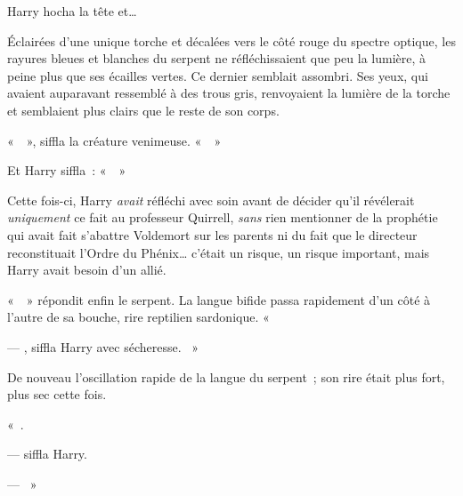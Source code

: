 Harry hocha la tête et…

Éclairées d'une unique torche et décalées vers le côté rouge du spectre optique, les rayures bleues et blanches du serpent ne réfléchissaient que peu la lumière, à peine plus que ses écailles vertes.
Ce dernier semblait assombri.
Ses yeux, qui avaient auparavant ressemblé à des trous gris, renvoyaient la lumière de la torche et semblaient plus clairs que le reste de son corps.

«~~», siffla la créature venimeuse.
«~~»

Et Harry siffla~: «~~»

Cette fois-ci, Harry \emph{avait} réfléchi avec soin avant de décider qu'il révélerait \emph{uniquement} ce fait au professeur Quirrell, \emph{sans} rien mentionner de la prophétie qui avait fait s'abattre Voldemort sur les parents ni du fait que le directeur reconstituait l'Ordre du Phénix… c'était un risque, un risque important, mais Harry avait besoin d'un allié.

«~~» répondit enfin le serpent.
La langue bifide passa rapidement d'un côté à l'autre de sa bouche, rire reptilien sardonique.
«~

--- , siffla Harry avec sécheresse.
~»

De nouveau l'oscillation rapide de la langue du serpent~; son rire était plus fort, plus sec cette fois.

«~.

---  siffla Harry.

--- ~»

